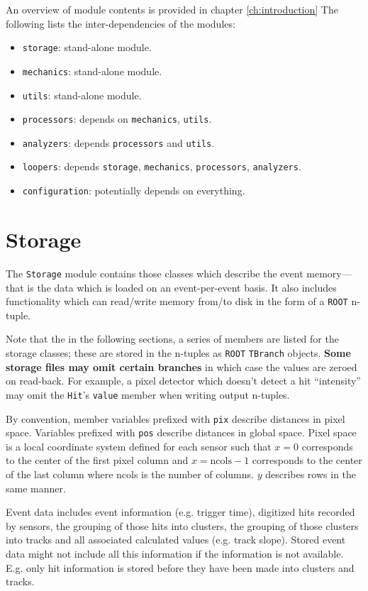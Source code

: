 \documentclass[10pt,a4paper]{book}
\newcommand{\ROOT}{\Verb`ROOT` }
\begin{document}
An overview of module contents is provided in chapter \ref{ch:introduction} The following lists the inter-dependencies of the modules:

\begin{itemize}
    \item \Verb`storage`: stand-alone module.
    \item \Verb`mechanics`: stand-alone module.
    \item \Verb`utils`: stand-alone module.
    \item \Verb`processors`: depends on \Verb`mechanics`, \Verb`utils`.
    \item \Verb`analyzers`: depends \Verb`processors` and \Verb`utils`.
    \item \Verb`loopers`: depends \Verb`storage`, \Verb`mechanics`, \Verb`processors`, \Verb`analyzers`.
    \item \Verb`configuration`: potentially depends on everything.
\end{itemize}

\section{Storage}

The \Verb`Storage` module contains those classes which describe the event memory---that is the data which is loaded on an event-per-event basis. It also includes functionality which can read/write memory from/to disk in the form of a \ROOT n-tuple.

Note that the in the following sections, a series of members are listed for the storage classes; these are stored in the n-tuples as \ROOT \Verb`TBranch` objects. \textbf{Some storage files may omit certain branches} in which case the values are zeroed on read-back. For example, a pixel detector which doesn't detect a hit ``intensity'' may omit the \Verb`Hit`'s \Verb`value` member when writing output n-tuples.

By convention, member variables prefixed with \Verb`pix` describe distances in pixel space. Variables prefixed with \Verb`pos` describe distances in global space. Pixel space is a local coordinate system defined for each sensor such that $x = 0$ corresponds to the center of the first pixel column and $x = \mathrm{ncols} - 1$ corresponds to the center of the last column where ncols is the number of columns. $y$ describes rows in the same manner.

Event data includes event information (e.g. trigger time), digitized hits recorded by sensors, the grouping of those hits into clusters, the grouping of those clusters into tracks and all associated calculated values (e.g. track slope). Stored event data might not include all this information if the information is not available. E.g. only hit information is stored before they have been made into clusters and tracks.
\end{document}
